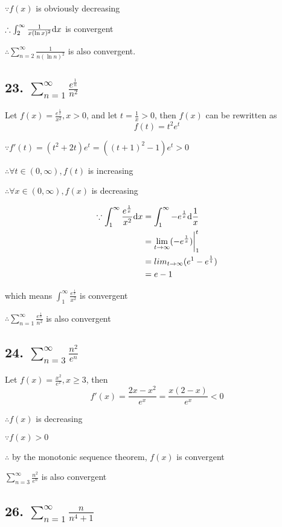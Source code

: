\documentclass{article}
\begin{document}
    $\because f(x)$ is obviously decreasing

    $\therefore \int_2^\infty \frac{1}{x(\ln x)^2} \textrm dx $ is convergent

    $\therefore \sum_{n=2}^\infty \frac{1}{n(\ln n)^2}$ is also convergent.

    \subsection*{23. $\sum_{n=1}^\infty \frac{e^{\frac 1 n}}{n^2}$}

    Let $f(x) = \frac{e^{\frac 1 x}}{x^2}, x > 0$, and let $t = \frac 1 x > 0$, then $f(x)$ can be rewritten as $$f(t) = t^2e^t$$

    $\because f'(t) = (t^2+2t)e^t = ((t+1)^2-1)e^t > 0$

    $\therefore \forall t \in (0, \infty), f(t)$ is increasing

    $\therefore \forall x \in (0, \infty), f(x)$ is decreasing

    $$\begin{aligned}
        \because \int_1^\infty \frac{e^{\frac 1 x}}{x^2} \textrm dx &= \int_1^\infty -e^{\frac 1 x}\textrm d\frac 1 x \\
        &= \lim_{t\to\infty}(-e^{\frac 1 x})\biggl|_1^t \\
        &= lim_{t\to\infty} (e^1 - e^{\frac 1 t}) \\
        &= e - 1
    \end{aligned}$$

    which means $\int_1^\infty \frac{e^{\frac 1 x}}{x^2}$ is convergent

    $\therefore \sum_{n=1}^\infty \frac{e^{\frac 1 n}}{n^2}$ is also convergent

    \subsection*{24. $\sum_{n=3}^\infty \frac{n^2}{e^n}$}

    Let $f(x) = \frac{x^2}{e^x}, x \geq 3$, then $$f'(x) = \frac{2x - x^2}{e^x} = \frac{x(2-x)}{e^x} < 0$$

    $\therefore f(x)$ is decreasing

    $\because f(x) > 0$

    $\therefore$ by the monotonic sequence theorem, $f(x)$ is convergent

    $\sum_{n=3}^\infty \frac{n^2}{e^n}$ is also convergent

    \subsection*{26. $\sum_{n=1}^\infty \frac{n}{n^4+1}$}
\end{document}
